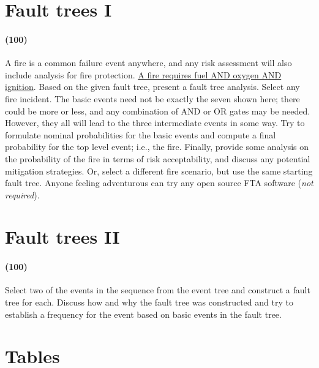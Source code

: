 \documentclass[11pt,a4paper]{article}
\begin{document}
\newpage

\section{Fault trees I}
\paragraph*{(100)}
A fire is a common failure event anywhere, and any risk assessment will also include analysis for fire protection. \href{https://images.sampletemplates.com/wp-content/uploads/2016/06/02114906/Fault-Tree-Analysis-Format.jpg}{A fire requires fuel AND oxygen AND ignition}. Based on the given fault tree, present a fault tree analysis. Select any fire incident. The basic events need not be exactly the seven shown here; there could be more or less, and any combination of AND or OR gates may be needed. However, they all will lead to the three intermediate events in some way. Try to formulate nominal probabilities for the basic events and compute a final probability for the top level event; i.e., the fire. Finally, provide some analysis on the probability of the fire in terms of risk acceptability, and discuss any potential mitigation strategies. Or, select a different fire scenario, but use the same starting fault tree. Anyone feeling adventurous can try any open source FTA software (\textit{not required}).
        
        
        
        
        
\newpage        
\section{Fault trees II}
\paragraph*{(100)}
Select two of the events in the sequence from the event tree and construct a fault tree for each. Discuss how and why the fault tree was constructed and try to establish a frequency for the event based on basic events in the fault tree.





\newpage


\section*{Tables}
\end{document}
